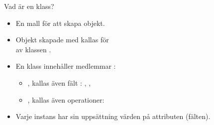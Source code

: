 

\begin{Slide}{Vad är en klass?}
\begin{itemize} 
\item En mall för att skapa objekt.
\item Objekt skapade med  kallas för\\   av klassen .
\item En klass innehåller medlemmar : 
  \begin{itemize} 
  \item {}, kallas även fält : , ,  
  \item {}, kallas även operationer: 
  \end{itemize}
\item Varje instans har sin uppsättning värden på attributen (fälten).
\end{itemize}

\end{Slide}



